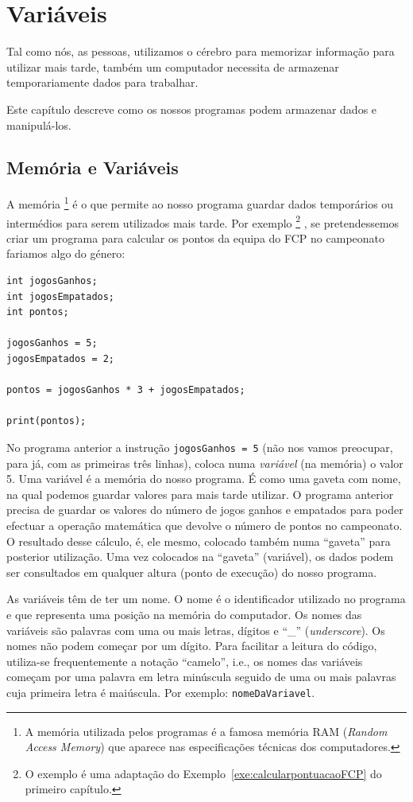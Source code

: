 \chapter{Variáveis}\label{cap:memoria}
Tal como nós, as pessoas, utilizamos o cérebro para memorizar informação para utilizar mais tarde, também um computador necessita de armazenar temporariamente dados para trabalhar.

Este capítulo descreve como os nossos programas podem armazenar dados e manipulá-los.

\section{Memória e Variáveis}
A memória%
\footnote{A memória utilizada pelos programas é a famosa memória RAM (\emph{Random Access Memory}) que aparece nas especificações técnicas dos computadores.}
 é o que permite ao nosso programa guardar dados temporários ou intermédios para serem utilizados mais tarde.
Por exemplo%
\footnote{O exemplo é uma adaptação do Exemplo~\ref{exe:calcularpontuacaoFCP} do primeiro capítulo.}%
, se pretendessemos criar um programa para calcular os pontos da equipa do FCP no campeonato fariamos algo do género:
\begin{lstlisting}[caption=Pontos do FCP (sintaxe Processing), label=exe:pontosFCPProcessing]
int jogosGanhos;
int jogosEmpatados;
int pontos;

jogosGanhos = 5;
jogosEmpatados = 2;

pontos = jogosGanhos * 3 + jogosEmpatados;

print(pontos);
\end{lstlisting}
No programa anterior a instrução \texttt{jogosGanhos = 5} (não nos vamos preocupar, para já, com as primeiras três linhas), coloca numa \emph{variável} (na memória) o valor 5. Uma variável
é a memória do nosso programa. É como uma gaveta com nome, na qual podemos guardar valores para mais tarde utilizar.
O programa anterior precisa de guardar os valores do número de jogos ganhos e empatados para poder efectuar a operação matemática que devolve o número de pontos no campeonato. O resultado desse cálculo, é, ele mesmo, colocado também numa ``gaveta'' para posterior utilização. Uma vez colocados na ``gaveta'' (variável), os dados podem ser consultados em qualquer altura (ponto de execução) do nosso programa. 

As variáveis têm de ter um nome. O nome é o identificador utilizado no programa e que representa uma posição na memória do computador. Os nomes das variáveis são palavras com uma ou mais letras, dígitos e ``\_'' (\emph{underscore}). Os nomes
não podem começar por um dígito. Para facilitar a leitura do código, utiliza-se frequentemente a notação ``camelo'',
i.e., os nomes das variáveis começam por uma palavra em letra minúscula seguido de uma ou mais palavras cuja primeira
letra é maiúscula. Por exemplo: \texttt{nomeDaVariavel}.

